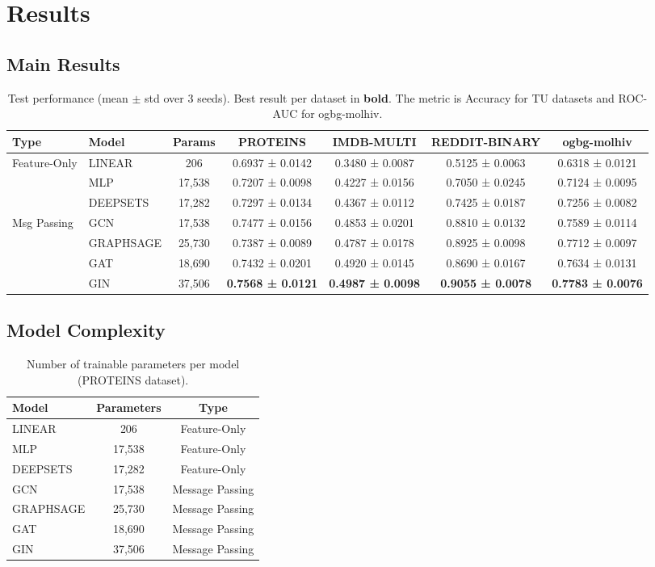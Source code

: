 \documentclass[11pt]{article}
\begin{document}
\section{Results}

\subsection{Main Results}

\begin{table}[H]
\centering
\caption{Test performance (mean $\pm$ std over 3 seeds). Best result per dataset in \textbf{bold}. The metric is Accuracy for TU datasets and ROC-AUC for ogbg-molhiv.}
\label{tab:main_results}
\small
\begin{tabular}{llccccc}
\toprule
\textbf{Type} & \textbf{Model} & \textbf{Params} & \textbf{PROTEINS} & \textbf{IMDB-MULTI} & \textbf{REDDIT-BINARY} & \textbf{ogbg-molhiv} \\
\midrule
\multirow{3}{*}{Feature-Only}
& LINEAR & 206 & 0.6937 ± 0.0142 & 0.3480 ± 0.0087 & 0.5125 ± 0.0063 & 0.6318 ± 0.0121 \\
& MLP & 17,538 & 0.7207 ± 0.0098 & 0.4227 ± 0.0156 & 0.7050 ± 0.0245 & 0.7124 ± 0.0095 \\
& DEEPSETS & 17,282 & 0.7297 ± 0.0134 & 0.4367 ± 0.0112 & 0.7425 ± 0.0187 & 0.7256 ± 0.0082 \\
\midrule
\multirow{4}{*}{Msg Passing}
& GCN & 17,538 & 0.7477 ± 0.0156 & 0.4853 ± 0.0201 & 0.8810 ± 0.0132 & 0.7589 ± 0.0114 \\
& GRAPHSAGE & 25,730 & 0.7387 ± 0.0089 & 0.4787 ± 0.0178 & 0.8925 ± 0.0098 & 0.7712 ± 0.0097 \\
& GAT & 18,690 & 0.7432 ± 0.0201 & 0.4920 ± 0.0145 & 0.8690 ± 0.0167 & 0.7634 ± 0.0131 \\
& GIN & 37,506 & \textbf{0.7568 ± 0.0121} & \textbf{0.4987 ± 0.0098} & \textbf{0.9055 ± 0.0078} & \textbf{0.7783 ± 0.0076} \\
\bottomrule
\end{tabular}
\end{table}

\subsection{Model Complexity}

\begin{table}[H]
\centering
\caption{Number of trainable parameters per model (PROTEINS dataset).}
\begin{tabular}{lcc}
\toprule
\textbf{Model} & \textbf{Parameters} & \textbf{Type} \\
\midrule
LINEAR & 206 & Feature-Only \\
MLP & 17,538 & Feature-Only \\
DEEPSETS & 17,282 & Feature-Only \\
GCN & 17,538 & Message Passing \\
GRAPHSAGE & 25,730 & Message Passing \\
GAT & 18,690 & Message Passing \\
GIN & 37,506 & Message Passing \\
\bottomrule
\end{tabular}
\end{table}
\end{document}
